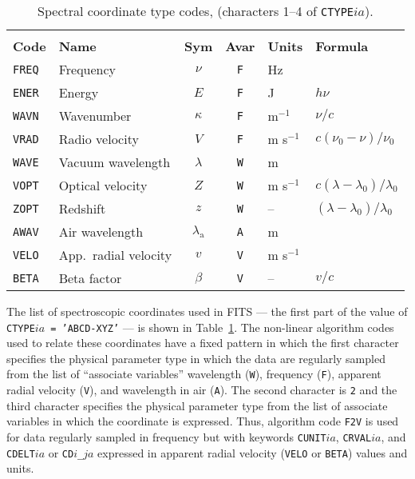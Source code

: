 \documentclass[twoside]{article}
\newcommand{\tablerowgapbefore}{-1ex}
\newcommand{\tablerowgapafter}{1ex}
\newcommand{\keyw}[1]{\hbox{{\tt #1}}}
\newcommand{\sub}[1]{_\mathrm{#1}}
\newcommand{\vv}{v}
\begin{document}
\begin{table}
\caption{Spectral coordinate type codes, (characters 1--4 of
    \keyw{CTYPE$ia$}).}
\label{tab:data.speclist}
\begin{center}
\begin{tabular}{|llccll|}
\cline{1-6}
&  & & & & \\ [\tablerowgapbefore]
{\bf Code} & {\bf Name} & {\bf Sym} & {\bf Avar} & {\bf Units}
    & {\bf Formula} \\ [\tablerowgapafter]
\keyw{FREQ} & Frequency
            & $\nu$
            & \keyw{F}
            & Hz
            &   \\
\keyw{ENER} & Energy
            & $E$
            & \keyw{F}
            & J
            & $h \nu$ \\
\keyw{WAVN} & Wavenumber
            & $\kappa$
            & \keyw{F}
            & m$^{-1}$
            & $\nu / c$ \\
\keyw{VRAD} & Radio velocity
            & $V$
            & \keyw{F}
            & m\,\,s$^{-1}$
            & $c (\nu_0 - \nu) / \nu_0$ \\
\keyw{WAVE} & Vacuum wavelength
            & $\lambda$
            & \keyw{W}
            & m
            & \\
\keyw{VOPT} & Optical velocity
            & $Z$
            & \keyw{W}
            & m\,\,s$^{-1}$
            & $ c (\lambda - \lambda_0) / \lambda_0$ \\
\keyw{ZOPT} & Redshift
            & $z$
            & \keyw{W}
            & --
            & $(\lambda - \lambda_0) / \lambda_0$ \\
\keyw{AWAV} & Air wavelength
            & $\lambda\sub{a}$
            & \keyw{A}
            & m
            &  \\
\keyw{VELO} & App.~radial velocity
            & $\vv$
            & \keyw{V}
            & m\,\,s$^{-1}$
            &  \\
\keyw{BETA} & Beta factor
            & $\beta$
            & \keyw{V}
            & --
            & $\vv / c$ \\ [\tablerowgapafter] \cline{1-6}
\end{tabular}
\end{center}
\end{table}

The list of spectroscopic coordinates used in FITS --- the first part
of the value of \keyw{CTYPE$ia$ = 'ABCD-XYZ'} --- is shown in
Table~\ref{tab:data.speclist}.  The non-linear algorithm codes used to
relate these coordinates have a fixed pattern in which the first
character specifies the physical parameter type in which the data are
regularly sampled from the list of ``associate variables'' wavelength
(\keyw{W}), frequency (\keyw{F}), apparent radial velocity (\keyw{V}),
and wavelength in air (\keyw{A})\@.  The second character is \keyw{2}
and the third character specifies the physical parameter type from
the list of associate variables in which the coordinate is expressed.
Thus, algorithm code \keyw{F2V} is used for data regularly sampled in
frequency but with keywords \keyw{CUNIT$ia$}, \keyw{CRVAL$ia$}, and
\keyw{CDELT$ia$} or \keyw{CD$i$\_$ja$} expressed in apparent radial
velocity (\keyw{VELO} or \keyw{BETA}) values and units.
\end{document}
